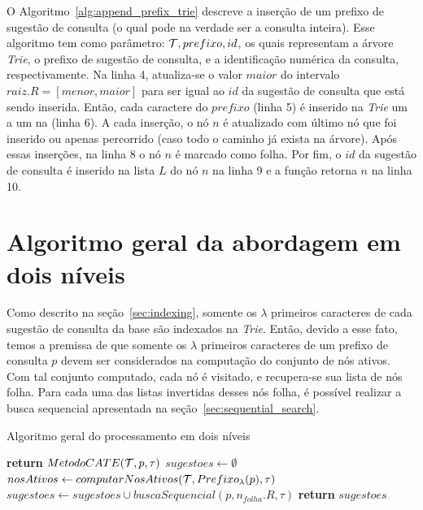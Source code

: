 O Algoritmo~\ref{alg:append_prefix_trie} descreve a inserção de um prefixo de sugestão de consulta (o qual pode na verdade ser a consulta inteira). Esse algoritmo tem como parâmetro: $\mathcal{T}, prefixo, id$, os quais representam a árvore \textit{Trie}, o prefixo de sugestão de consulta, e a identificação numérica da consulta, respectivamente. Na linha 4, atualiza-se o valor $maior$ do intervalo $raiz.R = [menor, maior]$ para ser igual ao $id$ da sugestão de consulta que está sendo inserida. Então, cada caractere do $prefixo$ (linha 5) é inserido na \textit{Trie} um a um na (linha 6). A cada inserção, o nó $n$ é atualizado com último nó que foi inserido ou apenas percorrido (caso todo o caminho já exista na árvore). Após essas inserções, na linha 8 o nó $n$ é marcado como folha. Por fim, o $id$ da sugestão de consulta é inserido na lista $L$ do nó $n$ na linha 9 e a função retorna $n$ na linha 10. 

\section{Algoritmo geral da abordagem em dois níveis}
\label{sec:general_two_level_algorithm}
Como descrito na seção~\ref{sec:indexing}, somente os $\lambda$ primeiros caracteres de cada sugestão de consulta da base são indexados na \textit{Trie}. Então, devido a esse fato, temos a premissa de que somente os $\lambda$ primeiros caracteres de um prefixo de consulta $p$ devem ser considerados na computação do conjunto de nós ativos. Com tal conjunto computado, cada nó é visitado, e recupera-se sua lista de nós folha. Para cada uma das listas invertidas desses nós folha, é possível realizar a busca sequencial apresentada na seção~\ref{sec:sequential_search}. 

\begin{algorithm}[H]
\caption{Algoritmo geral do processamento em dois níveis}\label{alg:general_two_level}
\begin{algorithmic}[1]
     \textbf{return} $MetodoCATE(\mathcal{T},p,\tau)$
    \EndIf
    \State $sugestoes \leftarrow \emptyset$
    \State $nosAtivos \leftarrow computarNosAtivos(\mathcal{T}, Prefixo_{\lambda}(p), \tau)$ 
     
            \State $sugestoes \leftarrow sugestoes \cup buscaSequencial(p, n_{folha}.R, \tau)$
        \EndFor
    \EndFor
    \State \textbf{return} $sugestoes$
\EndFunction
\end{algorithmic}
\end{algorithm}

